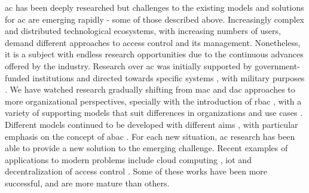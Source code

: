 \gls{ac} has been deeply researched but challenges to the existing models and solutions for \gls{ac} are emerging rapidly - some of those described above. Increasingly complex and distributed technological ecosystems, with increasing numbers of users, demand different approaches to access control and its management. Nonetheless, it is a subject with endless research opportunities due to the continuous advances offered by the industry. Research over \gls{ac} was initially supported by government-funded institutions \cite{lampson_protection_1974, graham_protection:_1972, harrison_protection_1976} and directed towards specific systems \cite{weissman_security_1969,  organick_multics_1972, satyanarayanan_integrating_1989}, with military purposes \cite{biba_integrity_1977, bell_secure_1973}. We have watched research gradually shifting from \gls{mac} \cite{bell_secure_1973, denning_lattice_1976, biba_integrity_1977, sandhu_lattice-based_1993} and \gls{dac} \cite{weissman_security_1969,  organick_multics_1972, graham_protection:_1972,lampson_protection_1974, harrison_protection_1976, sandhu_typed_1992} approaches to more organizational perspectives, specially with the introduction of \gls{rbac} \cite{ferraiolo_role-based_1992, sandhu_role-based_1996}, with a variety of supporting models \cite{bertino_trbac:_2000, chakraborty_trustbac:_2006, joshi_generalized_2005, ray_lrbac:_2006, thomas_team-based_1997}  that suit differences in organizations and use cases \cite{barkley_role_1997, gavrila_formal_1998, park_rbac_1999, park_role-based_2003}. Different models continued to be developed with different aims \cite{park_towards_2002, kalam_organization_2003, sandhu_usage_2003}, with particular emphasis on the concept of \gls{abac} \cite{wang_logic-based_2004, yuan_attributed_2005, goyal_attribute-based_2006, wang_hierarchical_2010, yu_attribute_2010, hu_guide_2014}. For each new situation, \gls{ac} research has been able to provide a new solution to the emerging challenge. Recent examples of applications to modern problems include cloud computing \cite{wang_hierarchical_2010, yu_attribute_2010, wan_hasbe:_2012, ruj_dacc:_2011,calero_toward_2010}, \gls{iot} \cite{ouaddah_access_2017, dorri_blockchain_2017} and decentralization of access control \cite{sandhu_peer--peer_2005, sandhu_decentralized_1998, miltchev_decentralized_2008}. Some of these works have been more successful, and are more mature than others.

